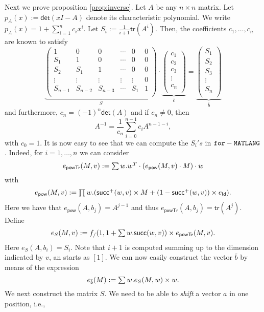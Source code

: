 Next we prove proposition \ref{prop:inverse}. Let $A$ be any $n \times n$ matrix.
Let $p_A(x):=\mathsf{det}(xI-A)$ denote its characteristic polynomial.
We write $p_A(x)=1 + \sum_{i=1}^n c_ix^i$. Let $S_i:=\frac{1}{i+1}\mathsf{tr}(A^i)$. 
Then, the coefficients $c_1,\ldots,c_n$ are known to satisfy 
$$
\underbrace{\left(\begin{matrix}
1 & 0 & 0 & \cdots & 0 & 0\\
S_1 & 1 & 0 & \cdots  &0 & 0\\
S_2 & S_1 & 1 & \cdots  &0 & 0\\
\vdots & \vdots & \vdots & \vdots & \vdots & 0\\
S_{n-1} & S_{n-2} & S_{n-3} & \cdots & S_1 & 1\\
\end{matrix}\right)}_{S}\cdot
\underbrace{\left(\begin{matrix}
c_1\\
c_2\\
c_3\\
\vdots\\
c_n\\
\end{matrix}\right)}_{\bar c}=\underbrace{\left(\begin{matrix}
S_1\\
S_2\\
S_3\\
\vdots\\
S_n\\
\end{matrix}\right)}_{\bar b}
$$
and furthermore, $c_n=(-1)^n\mathsf{det}(A)$ and if $c_{n}\neq 0$, then
$$
A^{-1}=\frac{1}{c_n}\sum_{i=0}^{n-1}c_i A^{n-1-i},
$$
with $c_0=1$. It is now easy to see that we can compute the $S_i's$ in $\texttt{for}-\texttt{MATLANG}$. Indeed, for
$i=1,\ldots,n$ we can consider
$$
e_{\mathsf{powTr}}(M,v):=\textstyle\sum w. w^T\cdot\left(e_{\mathsf{pow}}(M,v)\cdot M\right)\cdot w
$$
with 
$$
e_{\mathsf{pow}}(M,v):= \textstyle\prod w. (\mathsf{succ}^+(w,v)\times M+(1-\mathsf{succ}^+(w,v))\times e_{\mathsf{Id}}).
$$
Here we have that $e_{\mathsf{pow}}(A,b_j)=A^{j-1}$ and thus $e_{\mathsf{powTr}}(A,b_j)=\mathsf{tr}(A^j)$. Define 
$$
e_{S}(M,v):=f_{/}(1, 1 + \textstyle\sum w. \mathsf{succ}(w,v))\times e_{\mathsf{powTr}}(M,v).
$$
Here $e_{S}(A,b_i)=S_i$. Note that $i+1$ is computed summing up to the dimension indicated by $v$, an starts as $[1]$.
We can now easily construct the vector $\bar b$ by means of the expression
$$
e_{\bar b}(M):=\textstyle\sum w.e_{S}(M,w)\times w.
$$
We next construct the matrix $S$. We need to be able to \textit{shift} a vector $a$ in one position, i.e.,
